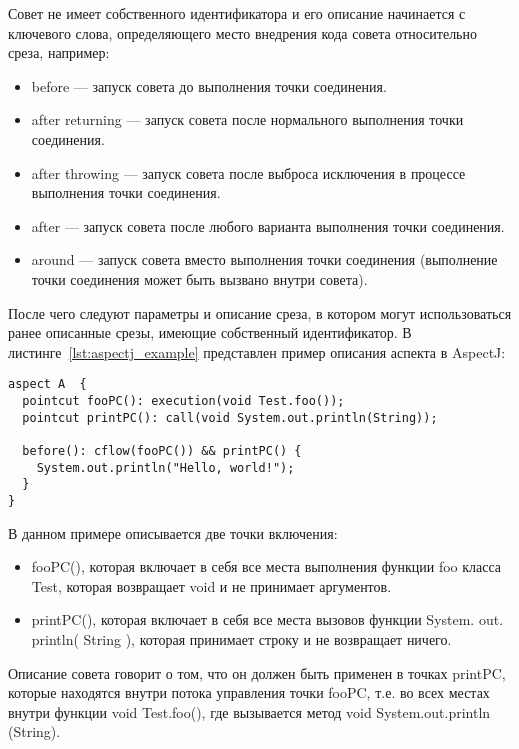 Совет не имеет собственного идентификатора и его описание начинается с
ключевого слова, определяющего место внедрения кода совета относительно среза,
например:
  \begin{itemize}
    \item before --- запуск совета до выполнения точки соединения.
    \item after returning --- запуск совета после нормального выполнения 
      точки соединения.
    \item after throwing --- запуск совета после выброса исключения в 
      процессе выполнения точки соединения.
    \item after --- запуск совета после любого варианта выполнения точки 
      соединения.
    \item around --- запуск совета вместо выполнения точки соединения 
      (выполнение точки соединения может быть вызвано внутри совета).
  \end{itemize}
После чего следуют параметры и описание среза, в котором могут использоваться
ранее описанные срезы, имеющие собственный идентификатор.
В листинге~\ref{lst:aspectj_example} представлен пример описания аспекта в 
AspectJ:
  \begin{lstlisting}[style={java}, label={lst:aspectj_example}, 
  caption={Пример описания аспектов в AspectJ}]
aspect A  {
  pointcut fooPC(): execution(void Test.foo());
  pointcut printPC(): call(void System.out.println(String));
  
  before(): cflow(fooPC()) && printPC() {
    System.out.println("Hello, world!");
  }
}
  \end{lstlisting}

В данном примере описывается две точки включения:
  \begin{itemize}
    \item fooPC(), которая включает в себя все места выполнения функции foo 
      класса Test, которая возвращает void и не принимает аргументов.
    \item printPC(), которая включает в себя все места вызовов функции 
      System. out. println( String ), которая принимает строку и не 
      возвращает ничего.
  \end{itemize}

Описание совета говорит о том, что он должен быть применен в точках 
printPC, которые находятся внутри потока управления точки fooPC, т.е. во 
всех местах внутри функции void Test.foo(), где вызывается метод void 
System.out.println (String).

